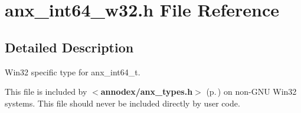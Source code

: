 \section{anx\_\-int64\_\-w32.h File Reference}
\label{anx__int64__w32_8h}


\subsection{Detailed Description}
Win32 specific type for anx\_\-int64\_\-t. 

This file is included by {\bf $<$annodex/anx\_\-types.h$>$ }{\rm (p.\,\pageref{anx__types_8h})} on non-GNU Win32 systems. This file should never be included directly by user code.

